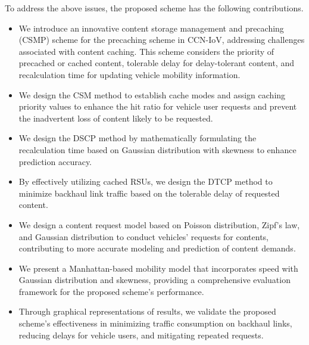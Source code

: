 \documentclass[journal]{IEEEtran}
\begin{document}
To address the above issues, the proposed scheme has the following contributions.
\begin{itemize}
    \item We introduce an innovative content storage management and precaching (CSMP) scheme for the precaching scheme in CCN-IoV, addressing challenges associated with content caching. This scheme considers the priority of precached or cached content, tolerable delay for delay-tolerant content, and recalculation time for updating vehicle mobility information.

    \item We design the CSM method to establish cache modes and assign caching priority values to enhance the hit ratio for vehicle user requests and prevent the inadvertent loss of content likely to be requested.

    \item We design the DSCP method by mathematically formulating the recalculation time based on Gaussian distribution with skewness to enhance prediction accuracy.

    \item By effectively utilizing cached RSUs, we design the DTCP method to minimize backhaul link traffic based on the tolerable delay of requested content.

    \item We design a content request model based on Poisson distribution, Zipf's law, and Gaussian distribution to conduct vehicles' requests for contents, contributing to more accurate modeling and prediction of content demands.

    \item We present a Manhattan-based mobility model that incorporates speed with Gaussian distribution and skewness, providing a comprehensive evaluation framework for the proposed scheme's performance.

    \item Through graphical representations of results, we validate the proposed scheme's effectiveness in minimizing traffic consumption on backhaul links, reducing delays for vehicle users, and mitigating repeated requests.
\end{itemize}


\end{document}
